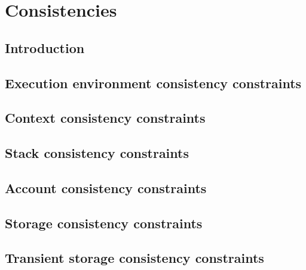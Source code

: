 

\section{Consistencies}                                                      \label{hub: consistencies}
\subsection{Introduction}                                                    \label{hub: consistencies: intro}                               \newpage
\subsection{Execution environment consistency constraints \lispDone{}}       \label{hub: consistencies: environment}           \newpage
\subsection{Context               consistency constraints \lispDone{}}       \label{hub: consistencies: context}                   \newpage
\subsection{Stack                 consistency constraints \lispDone{}}       \label{hub: consistencies: stack}                       \newpage
\subsection{Account               consistency constraints \lispDone{}}       \label{hub: consistencies: account}                   \newpage
\subsection{Storage               consistency constraints \lispDone{}}       \label{hub: consistencies: storage}                   \newpage
\subsection{Transient storage     consistency constraints \lispDone{}}       \label{hub: consistencies: transient storage}       \newpage
